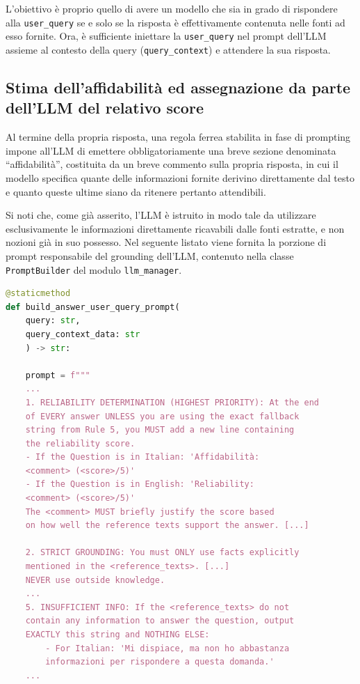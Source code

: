 L'obiettivo è proprio quello di avere un modello che sia in grado di rispondere alla \texttt{user\_query} se e solo se la risposta è effettivamente contenuta nelle fonti ad esso fornite. Ora, è sufficiente iniettare la \texttt{user\_query} nel prompt dell'LLM assieme al contesto della query (\texttt{query\_context}) e attendere la sua risposta.

\subsection{Stima dell'affidabilità ed assegnazione da parte dell'LLM del relativo score}
Al termine della propria risposta, una regola ferrea stabilita in fase di prompting impone all'LLM di emettere obbligatoriamente una breve sezione denominata ``affidabilità'', costituita da un breve commento sulla propria risposta, in cui il modello specifica quante delle informazioni fornite derivino direttamente dal testo e quanto queste ultime siano da ritenere pertanto attendibili.

Si noti che, come già asserito, l'LLM è istruito in modo tale da utilizzare esclusivamente le informazioni direttamente ricavabili dalle fonti estratte, e non nozioni già in suo possesso. Nel seguente listato viene fornita la porzione di prompt responsabile del grounding dell'LLM, contenuto nella classe \texttt{PromptBuilder} del modulo \texttt{llm\_manager}.

\begin{lstlisting}[language=Python, caption={Porzione di prompt che gestisce il grounding dell'LLM.}, label={lst:grounding_prompt}]
@staticmethod
def build_answer_user_query_prompt(
    query: str, 
    query_context_data: str
    ) -> str:

    prompt = f"""
    ...
    1. RELIABILITY DETERMINATION (HIGHEST PRIORITY): At the end 
    of EVERY answer UNLESS you are using the exact fallback 
    string from Rule 5, you MUST add a new line containing 
    the reliability score.
    - If the Question is in Italian: 'Affidabilità: 
    <comment> (<score>/5)'
    - If the Question is in English: 'Reliability: 
    <comment> (<score>/5)'
    The <comment> MUST briefly justify the score based 
    on how well the reference texts support the answer. [...]

    2. STRICT GROUNDING: You must ONLY use facts explicitly 
    mentioned in the <reference_texts>. [...] 
    NEVER use outside knowledge.
    ...
    5. INSUFFICIENT INFO: If the <reference_texts> do not 
    contain any information to answer the question, output 
    EXACTLY this string and NOTHING ELSE:
        - For Italian: 'Mi dispiace, ma non ho abbastanza 
        informazioni per rispondere a questa domanda.'
    ...

\end{lstlisting}

